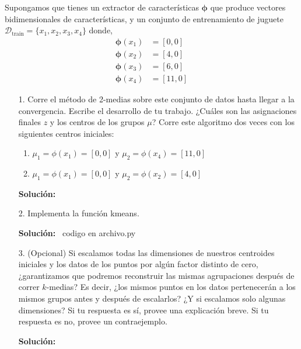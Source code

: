 \documentclass[11pt,letterpaper]{article}
\newenvironment{solution}{%
  \noindent\begin{shaded}
  \textbf{Solución:}\ }{
  \end{shaded}%
}
\begin{document}
Supongamos que tienes un extractor de características $\mathbf{\phi}$ que produce vectores bidimensionales de características, y un conjunto de entrenamiento de juguete $\mathcal{D}_\text{train} = \{x_1, x_2, x_3, x_4\}$ donde,
\[
\begin{aligned}
    \mathbf{\phi}(x_1) &= [0, 0] \\
    \mathbf{\phi}(x_2) &= [4, 0] \\
    \mathbf{\phi}(x_3) &= [6, 0] \\
    \mathbf{\phi}(x_4) &= [11, 0]
\end{aligned}
\]
\begin{enumerate}

\item[1.]
Corre el método de 2-medias sobre este conjunto de datos hasta llegar a la convergencia. Escribe el desarrollo de tu trabajo. ¿Cuáles son las asignaciones finales $z$ y los centros de los grupos $\mu$? Corre este algoritmo dos veces con los siguientes centros iniciales:
\begin{enumerate}
    \item $\mu_1 = \phi(x_1) = [0, 0]$ y $\mu_2 = \phi(x_4) = [11, 0]$
    \item $\mu_1 = \phi(x_1) = [0, 0]$ y $\mu_2 = \phi(x_2) = [4, 0]$
\end{enumerate}

\begin{solution}
    
\end{solution}

\item[2.]
 Implementa la función kmeans.
 \begin{solution}
    codigo en archivo.py
  \end{solution}
\item[3.]
(Opcional) Si escalamos todas las dimensiones de nuestros centroides iniciales y los datos de los puntos por algún factor distinto de cero, ¿garantizamos que podremos reconstruir las mismas agrupaciones después de correr $k$-medias? Es decir, ¿los mismos puntos en los datos pertenecerán a los mismos grupos antes y después de escalarlos? ¿Y si escalamos solo algunas dimensiones? Si tu respuesta es sí, provee una explicación breve. Si tu respuesta es no, provee un contraejemplo.

  \begin{solution}
 
  \end{solution}

\end{enumerate}
\end{document}

